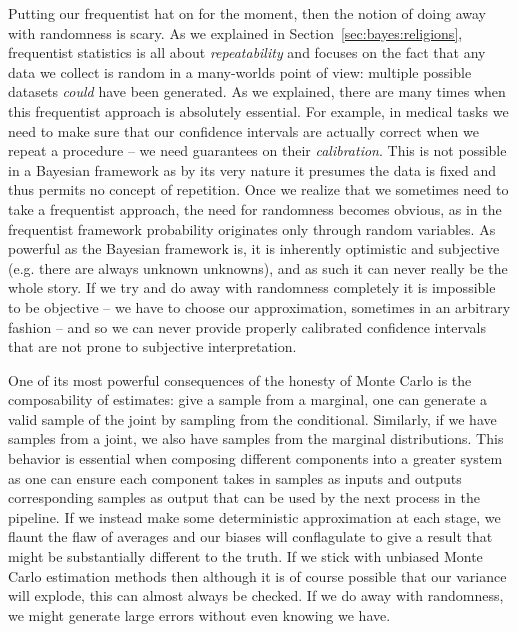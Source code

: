 Putting our frequentist hat on for the moment, then the notion of doing away with randomness is scary.
As we explained in Section~\ref{sec:bayes:religions},
frequentist statistics is all about \emph{repeatability} and focuses on the fact that any data we collect is random
in a many-worlds point of view: multiple possible
datasets \emph{could} have been generated.  As we explained, there are many times when this frequentist
approach is absolutely essential.  For example, in medical tasks we need
to make sure that our confidence intervals are actually correct when we repeat a procedure -- we need guarantees on
their \emph{calibration}.  This is not possible in a Bayesian framework as by its very nature it presumes the data
is fixed and thus permits no concept of repetition.  Once we realize that we sometimes need to take a frequentist
approach, the need for randomness becomes obvious, as in the frequentist framework probability originates only
through random variables.  As powerful as the Bayesian framework is, it is inherently optimistic and subjective
(e.g. there are always unknown unknowns), and as such it can never really be the whole story.  If we try and
do away with randomness completely it is impossible to be objective -- we have to choose our approximation, sometimes
in an arbitrary fashion -- and so we can never provide properly calibrated confidence 
intervals that are not prone to subjective interpretation.

One of its most powerful consequences of the honesty of Monte Carlo is the composability
of estimates: give a sample from a marginal, one can generate a valid sample of the joint by sampling from the
conditional.  Similarly, if we have samples from a joint, we also have samples from the marginal distributions.  This behavior
is essential when composing different components into a greater system as one can ensure each component takes in
samples as inputs and outputs corresponding samples as output that can be used by the next process in the pipeline.
If we instead make some deterministic approximation at each stage, we flaunt the flaw of averages and our biases
will conflagulate to give a result that might be substantially different to the truth.  If we stick with unbiased Monte Carlo estimation
methods then although it is of course possible that our variance will explode, this can almost always be checked.
If we do away with randomness, we might generate large errors without even knowing we have.

